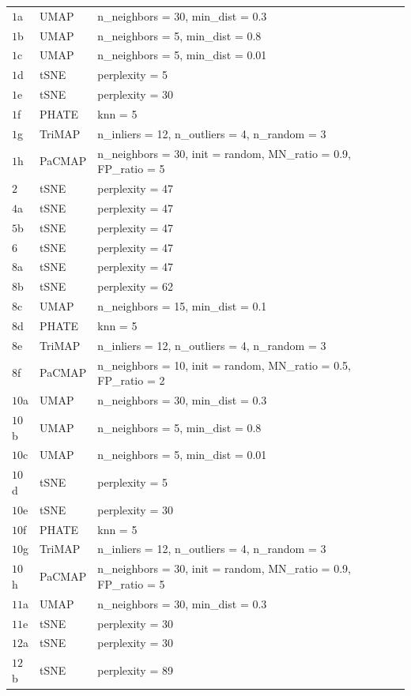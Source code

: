 \documentclass[
  11pt,
  a4paper,
]{report}
\begin{document}
\begin{longtable}{>{\raggedright\arraybackslash}p{1.5cm}>{\raggedright\arraybackslash}p{2cm}>{\raggedright\arraybackslash}p{10cm}}
\endfoot
\bottomrule
\endlastfoot
$1$a & UMAP & n\_neighbors = 30, min\_dist = 0.3\\
$1$b & UMAP & n\_neighbors = 5, min\_dist = 0.8\\
$1$c & UMAP & n\_neighbors = 5, min\_dist = 0.01\\
$1$d & tSNE & perplexity = 5\\
$1$e & tSNE & perplexity = 30\\
$1$f & PHATE & knn = 5\\
$1$g & TriMAP & n\_inliers = 12, n\_outliers = 4, n\_random = 3\\
$1$h & PaCMAP & n\_neighbors = 30, init = random, MN\_ratio = 0.9, FP\_ratio = 5\\
\midrule
$2$ & tSNE & perplexity = 47\\
$4$a & tSNE & perplexity = 47\\
$5$b & tSNE & perplexity = 47\\
$6$ & tSNE & perplexity = 47\\
\midrule
$8$a & tSNE & perplexity = 47\\
$8$b & tSNE & perplexity = 62\\
$8$c & UMAP & n\_neighbors = 15, min\_dist = 0.1\\
$8$d & PHATE & knn = 5\\
$8$e & TriMAP & n\_inliers = 12, n\_outliers = 4, n\_random = 3\\
$8$f & PaCMAP & n\_neighbors = 10, init = random, MN\_ratio = 0.5, FP\_ratio = 2\\
\midrule
$10$a & UMAP & n\_neighbors = 30, min\_dist = 0.3\\
$10$b & UMAP & n\_neighbors = 5, min\_dist = 0.8\\
$10$c & UMAP & n\_neighbors = 5, min\_dist = 0.01\\
$10$d & tSNE & perplexity = 5\\
$10$e & tSNE & perplexity = 30\\
$10$f & PHATE & knn = 5\\
$10$g & TriMAP & n\_inliers = 12, n\_outliers = 4, n\_random = 3\\
$10$h & PaCMAP & n\_neighbors = 30, init = random, MN\_ratio = 0.9, FP\_ratio = 5\\
\midrule
$11$a & UMAP & n\_neighbors = 30, min\_dist = 0.3\\
$11$e & tSNE & perplexity = 30\\
\midrule
$12$a & tSNE & perplexity = 30\\
$12$b & tSNE & perplexity = 89\\

\end{longtable}
\end{document}
